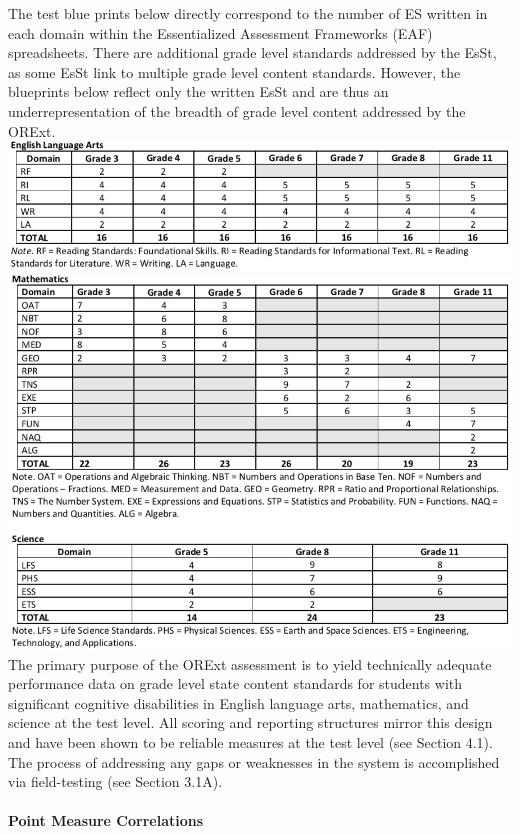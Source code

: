 \documentclass[]{article}
\let\oldparagraph\paragraph
\renewcommand{\paragraph}[1]{\oldparagraph{#1}\mbox{}}
\begin{document}
The test blue prints below directly correspond to the number of ES
written in each domain within the Essentialized Assessment Frameworks
(EAF) spreadsheets. There are additional grade level standards addressed
by the EsSt, as some EsSt link to multiple grade level content
standards. However, the blueprints below reflect only the written EsSt
and are thus an underrepresentation of the breadth of grade level
content addressed by the ORExt.\FloatBarrier
\includegraphics{Figures/EsSt/EsStELA.png} \FloatBarrier
\includegraphics{Figures/EsSt/EsStMathScience.png} The primary purpose
of the ORExt assessment is to yield technically adequate performance
data on grade level state content standards for students with
significant cognitive disabilities in English language arts,
mathematics, and science at the test level. All scoring and reporting
structures mirror this design and have been shown to be reliable
measures at the test level (see Section 4.1). The process of addressing
any gaps or weaknesses in the system is accomplished via field-testing
(see Section 3.1A).

\paragraph{Point Measure Correlations}\label{point-measure-correlations}
\end{document}
